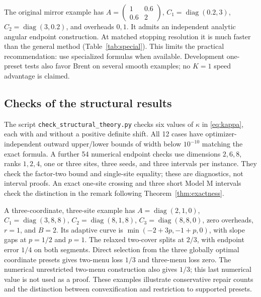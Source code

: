 \documentclass[11pt]{article}
\newcommand{\diag}{\operatorname{diag}}
\begin{document}
The original mirror example has
$A=\left(\begin{smallmatrix}1&0.6\\0.6&2\end{smallmatrix}\right)$,
$C_1=\diag(0.2,3)$, $C_2=\diag(3,0.2)$, and overheads $0,1$.
It admits an independent analytic angular endpoint construction.
At matched stopping resolution it is much faster than the general method
(Table~\ref{tab:special}). This limits the practical recommendation:
use specialized formulas when available. Development one-preset tests also
favor Brent on several smooth examples; no $K=1$ speed advantage is claimed.

\begin{table}[t]\centering
\caption{Specialized mirror solver versus general reuse, median seconds from
three repetitions. All numerical loss differences are below $5\times10^{-6}$.}
\label{tab:special}
\end{table}

\subsection{Checks of the structural results}
The script \texttt{check\_structural\_theory.py} checks six values of
$\kappa$ in \eqref{eq:kappa}, each with and without a positive definite
shift. All 12 cases have optimizer-independent outward upper/lower bounds
of width below $10^{-10}$ matching the exact formula. A further 54 numerical
endpoint checks use dimensions $2,6,8$, ranks $1,2,4$, one or three sites,
three seeds, and three intervals per instance. They check the factor-two
bound and single-site equality; these are diagnostics, not interval proofs.
An exact one-site crossing and three short Model M intervals check the
distinction in the remark following Theorem~\ref{thm:exactness}.

A three-coordinate, three-site example has $A=\diag(2,1,0)$,
$C_1=\diag(3,8,8)$, $C_2=\diag(8,1,8)$,
$C_3=\diag(8,8,0)$, zero overheads, $r=1$, and $B=2$.
Its adaptive curve is $\min(-2+3p,-1+p,0)$, with slope gaps at
$p=1/2$ and $p=1$. The relaxed two-cover splits at $2/3$, with
endpoint error $1/4$ on both segments. Direct selection from the three
globally optimal coordinate presets gives two-menu loss $1/3$ and
three-menu loss zero. The numerical unrestricted two-menu construction
also gives $1/3$; this last numerical value is not used as a proof.
These examples illustrate conservative repair counts and the distinction
between convexification and restriction to supported presets.
\end{document}
